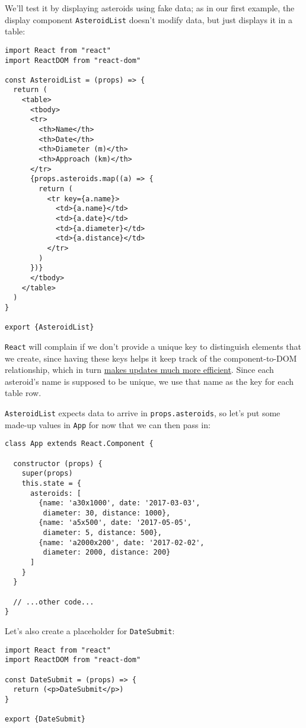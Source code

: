 We'll test it by displaying asteroids using fake data;
as in our first example,
the display component \texttt{AsteroidList} doesn't modify data,
but just displays it in a table:

\begin{verbatim}
import React from "react"
import ReactDOM from "react-dom"

const AsteroidList = (props) => {
  return (
    <table>
      <tbody>
      <tr>
        <th>Name</th>
        <th>Date</th>
        <th>Diameter (m)</th>
        <th>Approach (km)</th>
      </tr>
      {props.asteroids.map((a) => {
        return (
          <tr key={a.name}>
            <td>{a.name}</td>
            <td>{a.date}</td>
            <td>{a.diameter}</td>
            <td>{a.distance}</td>
          </tr>
        )
      })}
      </tbody>
    </table>
  )
}

export {AsteroidList}
\end{verbatim}

\texttt{React} will complain if we don't provide a unique key
to distinguish elements that we create,
since having these keys helps it keep track of the component-to-DOM relationship,
which in turn \href{https://stackoverflow.com/questions/28329382/understanding-unique-keys-for-array-children-in-react-js}{makes updates much more efficient}.
Since each asteroid's name is supposed to be unique,
we use that name as the key for each table row.

\texttt{AsteroidList} expects data to arrive in \texttt{props.asteroids},
so let's put some made-up values in \texttt{App} for now
that we can then pass in:

\begin{verbatim}
class App extends React.Component {

  constructor (props) {
    super(props)
    this.state = {
      asteroids: [
        {name: 'a30x1000', date: '2017-03-03',
         diameter: 30, distance: 1000},
        {name: 'a5x500', date: '2017-05-05',
         diameter: 5, distance: 500},
        {name: 'a2000x200', date: '2017-02-02',
         diameter: 2000, distance: 200}
      ]
    }
  }

  // ...other code...
}
\end{verbatim}

Let's also create a placeholder for \texttt{DateSubmit}:

\begin{verbatim}
import React from "react"
import ReactDOM from "react-dom"

const DateSubmit = (props) => {
  return (<p>DateSubmit</p>)
}

export {DateSubmit}
\end{verbatim}

